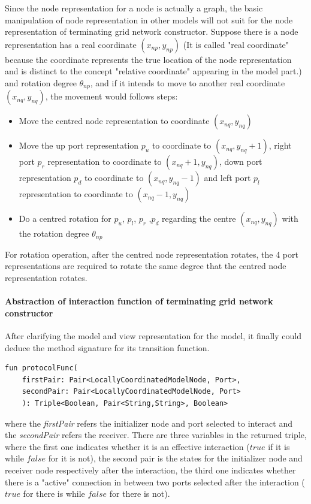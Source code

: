 \par\noindent
Since the node representation for a node is actually a graph, the basic manipulation of node representation in other models will not suit for the node representation of
terminating grid network constructor. Suppose there is a node representation has a real coordinate $(x_{np}, y_{np})$ (It is called "real coordinate" because the coordinate represents the true
location of the node representation and is distinct to the concept "relative coordinate" appearing in the model part.) and rotation degree $\theta_{np}$, and if it intends to
move to another real coordinate $(x_{nq}, y_{nq})$, the movement would follows steps:
\begin{itemize}
  \item Move the centred node representation to coordinate $(x_{nq}, y_{nq})$
  \item Move the up port representation $p_{u}$ to coordinate to $(x_{nq}, y_{nq} + 1)$, right port $p_{r}$ representation to coordinate to $(x_{nq} + 1, y_{nq})$,  down port representation $p_{d}$ to coordinate to $(x_{nq}, y_{nq} - 1)$
  and left port $p_{l}$ representation to coordinate to $(x_{nq} - 1, y_{nq})$
  \item Do a centred rotation for $p_{u}$, $p_{l}$, $p_{r}$ ,$p_{d}$ regarding the centre $(x_{nq}, y_{nq})$ with the rotation degree $\theta_{np}$
\end{itemize}
For rotation operation, after the centred node representation rotates, the 4 port representations are required to rotate the same degree that the centred node representation rotates.

\paragraph{Abstraction of interaction function of terminating grid network constructor}
After clarifying the model and view representation for the model, it finally could deduce the method signature for its transition function.
\begin{lstlisting}[caption = {Abstraction for terminating grid network constructor interaction function}, style = mykotlin]
  fun protocolFunc(
    firstPair: Pair<LocallyCoordinatedModelNode, Port>,
    secondPair: Pair<LocallyCoordinatedModelNode, Port>
    ): Triple<Boolean, Pair<String,String>, Boolean>
\end{lstlisting}
where the \textit{firstPair} refers the initializer node and port selected to interact and the \textit{secondPair} refers the receiver.
There are three variables in the returned triple, where the first one indicates whether it is an effective interaction ($true$ if it is while $false$ for it is not), the second pair is the states
for the initializer node and receiver node respectively after the interaction, the third one indicates whether there is a "active" connection
in between two ports selected after the interaction ($true$ for there is while $false$ for there is not).

